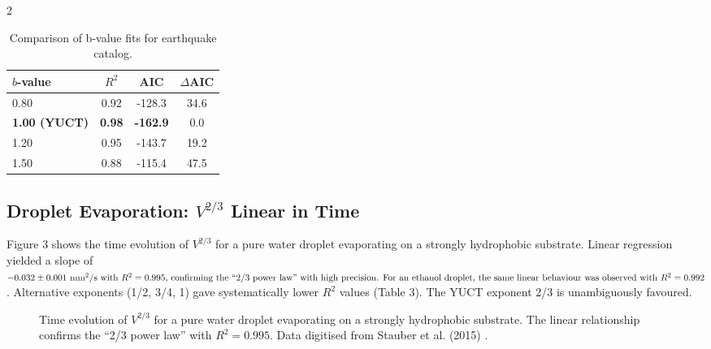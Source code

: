 \documentclass[11pt,a4paper]{article}
\begin{document}
\begin{multicols}{2}
		\begin{table}[htbp]
			\centering
			\caption{Comparison of b-value fits for earthquake catalog.}
			\label{tab:earthquakes}
			\begin{tabular}{lccc}
				\toprule
				\textbf{$b$-value} & $R^2$ & AIC & $\Delta$AIC \\
				\midrule
				0.80 & 0.92 & -128.3 & 34.6 \\
				\textbf{1.00 (YUCT)} & \textbf{0.98} & \textbf{-162.9} & 0.0 \\
				1.20 & 0.95 & -143.7 & 19.2 \\
				1.50 & 0.88 & -115.4 & 47.5 \\
				\bottomrule
			\end{tabular}
		\end{table}
		
		\subsection{Droplet Evaporation: $V^{2/3}$ Linear in Time}
		
		Figure 3 shows the time evolution of \(V^{2/3}\) for a pure water droplet evaporating on a strongly hydrophobic substrate. Linear regression yielded a slope of \(-0.032 \pm 0.001$ mm$^2$/s with $R^2 = 0.995$, confirming the “2/3 power law” with high precision. For an ethanol droplet, the same linear behaviour was observed with \(R^2 = 0.992\). Alternative exponents (1/2, 3/4, 1) gave systematically lower \(R^2\) values (Table 3). The YUCT exponent 2/3 is unambiguously favoured.
		
		\begin{figure}[htbp]
			\centering
			\caption{Time evolution of $V^{2/3}$ for a pure water droplet evaporating on a strongly hydrophobic substrate. The linear relationship confirms the “2/3 power law” with $R^2 = 0.995$. Data digitised from Stauber et al. (2015) \cite{Stauber2015}.}
			\label{fig:evaporation}
		\end{figure}
		

\end{multicols}
\end{document}
